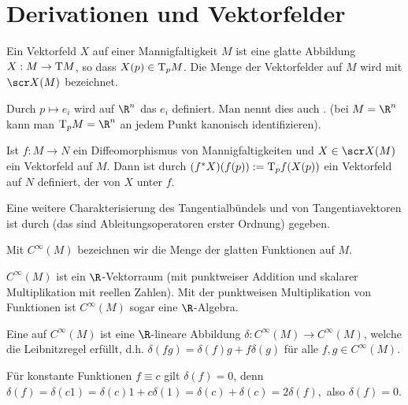 

\section{Derivationen und Vektorfelder}


\begin{df} \label{3.7}
    Ein Vektorfeld $X$ auf einer Mannigfaltigkeit $M$ ist eine glatte Abbildung $X: M \to \mathrm{T} M$, so dass $X(p) \in \mathrm{T}_p M$.
    Die Menge der Vektorfelder auf $M$ wird mit $\scr X(M)$ bezeichnet.
\end{df}

\begin{ex*}
    Durch $p \mapsto e_i$ wird auf $\R^n$ das  $e_i$ definiert.
    Man nennt dies auch .
    (bei $M = \R^n$ kann man $\T_p M = \R^n$ an jedem Punkt kanonisch identifizieren).
\end{ex*}

\begin{df} \label{3.8}
    Ist $f: M \to N$ ein Diffeomorphismus von Mannigfaltigkeiten und $X \in \scr X(M)$ ein Vektorfeld auf $M$.
    Dann ist durch
    \begin{math}
        (f^* X)(f(p)) := \mathrm{T}_p f(X(p))
    \end{math}
    ein Vektorfeld auf $N$ definiert, der  von $X$ unter $f$.
\end{df}

Eine weitere Charakterisierung des Tangentialbündels und von Tangentiavektoren ist durch  (das sind Ableitungsoperatoren erster Ordnung) gegeben.

\begin{df} \label{3.9}
    Mit $C^\infty(M)$ bezeichnen wir die Menge der glatten Funktionen auf $M$.
    \begin{note}
        $C^\infty(M)$ ist ein $\R$-Vektorraum (mit punktweiser Addition und skalarer Multiplikation mit reellen Zahlen).
        Mit der punktweisen Multiplikation von Funktionen ist $C^\infty(M)$ sogar eine $\R$-Algebra.
    \end{note}
\end{df}

\begin{df} \label{3.10}
    Eine  auf $C^\infty(M)$ ist eine $\R$-lineare Abbildung $\delta: C^\infty(M) \to C^\infty(M)$, welche die Leibnitzregel erfüllt, d.h.
    \begin{math}
        \delta(fg) = \delta(f) g + f \delta(g)
    \end{math}
    für alle $f, g \in C^\infty(M)$.
    \begin{note}
        Für konstante Funktionen $f \equiv c$ gilt $\delta(f) = 0$, denn
        \begin{math}
            \delta(f) = \delta(c 1)
            = \delta(c)1 + c \delta(1)
            = \delta(c) + \delta(c)
            = 2 \delta(f),
        \end{math}
        also $\delta(f) = 0$.
    \end{note}
\end{df}

